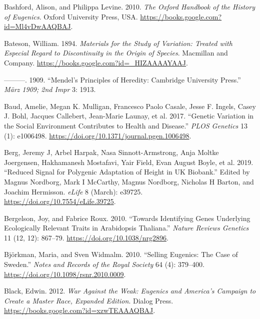 \documentclass[
]{book}
\newlength{\cslhangindent}
\newlength{\cslentryspacingunit} %
\newenvironment{CSLReferences}[2] %
 {%
  \setlength{\parindent}{0pt}
  \ifodd #1
  \let\oldpar\par
  \def\par{\hangindent=\cslhangindent\oldpar}
  \fi
  \setlength{\parskip}{#2\cslentryspacingunit}
 }%
 {}
\begin{document}
\begin{CSLReferences}{1}{0}
\leavevmode{}%
Bashford, Alison, and Philippa Levine. 2010. \emph{The {Oxford Handbook} of the {History} of {Eugenics}}. {Oxford University Press, USA}. \url{https://books.google.com?id=Ml4vDwAAQBAJ}.

\leavevmode{}%
Bateson, William. 1894. \emph{Materials for the {Study} of {Variation}: {Treated} with {Especial Regard} to {Discontinuity} in the {Origin} of {Species}}. {Macmillan and Company}. \url{https://books.google.com?id=_HIZAAAAYAAJ}.

\leavevmode{}%
---------. 1909. {``Mendel's {Principles} of {Heredity}: {Cambridge University Press}.''} \emph{März 1909; 2nd Impr} 3: 1913.

\leavevmode{}%
Baud, Amelie, Megan K. Mulligan, Francesco Paolo Casale, Jesse F. Ingels, Casey J. Bohl, Jacques Callebert, Jean-Marie Launay, et al. 2017. {``Genetic {Variation} in the {Social Environment Contributes} to {Health} and {Disease}.''} \emph{PLOS Genetics} 13 (1): e1006498. \url{https://doi.org/10.1371/journal.pgen.1006498}.

\leavevmode{}%
Berg, Jeremy J, Arbel Harpak, Nasa Sinnott-Armstrong, Anja Moltke Joergensen, Hakhamanesh Mostafavi, Yair Field, Evan August Boyle, et al. 2019. {``Reduced Signal for Polygenic Adaptation of Height in {UK Biobank}.''} Edited by Magnus Nordborg, Mark I McCarthy, Magnus Nordborg, Nicholas H Barton, and Joachim Hermisson. \emph{eLife} 8 (March): e39725. \url{https://doi.org/10.7554/eLife.39725}.

\leavevmode{}%
Bergelson, Joy, and Fabrice Roux. 2010. {``Towards Identifying Genes Underlying Ecologically Relevant Traits in {Arabidopsis} Thaliana.''} \emph{Nature Reviews Genetics} 11 (12, 12): 867--79. \url{https://doi.org/10.1038/nrg2896}.

\leavevmode{}%
Björkman, Maria, and Sven Widmalm. 2010. {``Selling Eugenics: The Case of {Sweden}.''} \emph{Notes and Records of the Royal Society} 64 (4): 379--400. \url{https://doi.org/10.1098/rsnr.2010.0009}.

\leavevmode{}%
Black, Edwin. 2012. \emph{War {Against} the {Weak}: {Eugenics} and {America}'s {Campaign} to {Create} a {Master Race}, {Expanded Edition}}. {Dialog Press}. \url{https://books.google.com?id=xzwTEAAAQBAJ}.


\end{CSLReferences}
\end{document}
